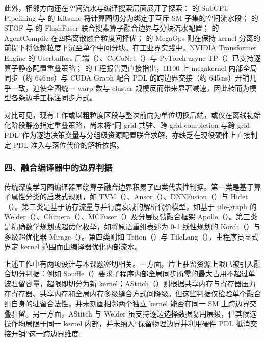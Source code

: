 此外，相邻方向还在空间流水与编译搜索层面展开了探索： 的 SubGPU Pipelining 与  的 Kitsune 将计算图切分为绑定于互斥 SM 子集的空间流水段； 的 STOF 与  的 FlashFuser 联合搜索算子融合边界与分块流水配置； 的 AgentCompile 在四档离散融合粒度间择优； 的 MegaOps 则在保持 kernel 分离的前提下将依赖粒度下沉至单个中间分块。在工业界实践中，NVIDIA Transformer Engine 的 Userbuffers 后端（）、CoCoNet（）与 PyTorch async-TP（）已支持逐算子静态配置重叠策略； 的工程报告更直接指出，H100 上 megakernel 内部全局同步（约 646\,ns）与 CUDA Graph 配合 PDL 的跨边界交接（约 645\,ns）开销几乎一致，迫使全图统一 warp 数与 cluster 规模反而带来显著减速，因此转而为模型各条边手工标注同步方式。

对比可见，现有工作或以粗粒度区段与整次前向为单位切换后端，或仅在离线初始化阶段静态指定重叠策略，尚未将“同 grid 共驻、跨 grid completion 与跨 grid PDL”作为逐边决策变量与分组级资源配置联合求解，亦缺乏在现役硬件上直接判定 PDL 准入与落位代价的解析依据。

\subsubsection*{四、融合编译器中的边界判据}

传统深度学习图编译器围绕算子融合边界积累了四类代表性判据。第一类是基于算子属性分类的启发式规则，如 TVM（）、Ansor（）、DNNFusion（）与 Hidet（）。第二类是基于访存流量与并行度衰减的解析代价模型，如基于 tile-graph 的 Welder（）、Chimera（）、MCFuser（）及分层反馈融合框架 Apollo（）。第三类是精确数学规划或超优化枚举，如将原语重组表述为 0-1 线性规划的 Korch（）与多级超优化器 Mirage（）。第四类则如 Triton（）与 TileLang（），由程序员显式界定 kernel 范围而由编译器优化内部流水。

上述工作中有两项设计与本课题密切相关。一方面，片上驻留资源上限已被引入融合切分判据：例如 Souffle（）要求子程序内部全局同步所需的最大占用不超过单波驻留容量，超限即切分为新 kernel；AStitch（）则根据共享内存与寄存器压力在寄存器、共享内存和全局内存多级缝合方式间降级。但这些判据仅检验单个融合组自身的驻留合法性，并未刻画相邻两个独立 kernel 能否在同一 SM 上跨边界交叠驻留。另一方面，AStitch 与 Welder 虽支持逐边选择数据复用层级，但其候选操作均局限于同一 kernel 内部，并未纳入“保留物理边界并利用硬件 PDL 抵消交接开销”这一跨边界维度。

